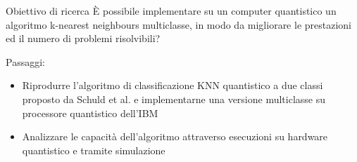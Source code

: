 \documentclass{beamer}
\begin{document}
    \begin{frame}{Obiettivo di ricerca}
        È possibile implementare su un computer quantistico un 
        algoritmo k-nearest neighbours multiclasse, in modo da 
        migliorare le prestazioni ed il numero di problemi risolvibili? 

        \vspace{.5cm}

        Passaggi: 
        \begin{itemize}
            \item Riprodurre l'algoritmo di classificazione KNN quantistico a due classi proposto da Schuld et al. \cite{schuld} e implementarne una versione multiclasse su processore quantistico dell'IBM
            \item Analizzare le capacità dell'algoritmo attraverso esecuzioni su hardware quantistico e tramite simulazione
        \end{itemize}
    \end{frame}
\end{document}
